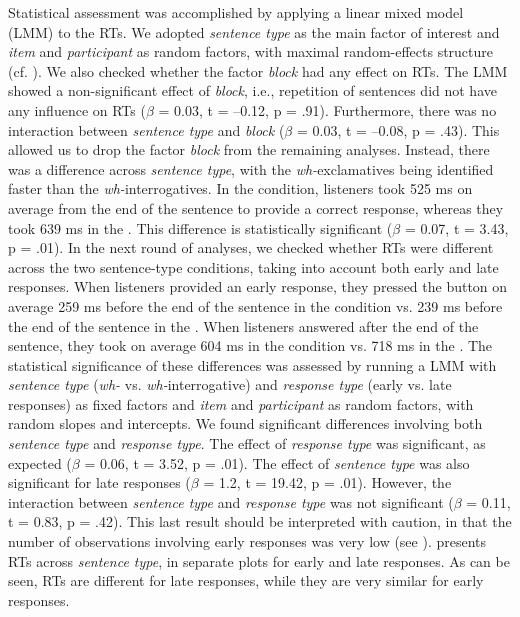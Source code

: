 \documentclass[output=paper]{langsci/langscibook}
\begin{document}
Statistical assessment was accomplished by applying a linear mixed model (LMM) to the RTs. We adopted \textit{sentence type} as the main factor of interest and \textit{item} and \textit{participant} as random factors, with maximal random-effects structure (cf. \citealt{Barr2013}). We also checked whether the factor \textit{block} had any effect on RTs. The LMM showed a non-significant effect of \textit{block}, i.e., repetition of sentences did not have any influence on RTs ($\beta $ = 0.03, t = –0.12, p = .91). Furthermore, there was no interaction between \textit{sentence type} and \textit{block} ($\beta $ = 0.03, t = –0.08, p = .43). This allowed us to drop the factor \textit{block} from the remaining analyses. Instead, there was a difference across \textit{sentence type}, with the \textit{wh-}exclamatives being identified faster than the \textit{wh-}interrogatives. In the  condition, listeners took 525 ms on average from the end of the sentence to provide a correct response, whereas they took 639 ms in the . This difference is statistically significant ($\beta $ = 0.07, t = 3.43, p = .01). In the next round of analyses, we checked whether RTs were different across the two sentence-type conditions, taking into account both early and late responses. When listeners provided an early response, they pressed the button on average 259 ms before the end of the sentence in the  condition vs. 239 ms before the end of the sentence in the . When listeners answered after the end of the sentence, they took on average 604 ms in the  condition vs. 718 ms in the . The statistical significance of these differences was assessed by running a LMM with \textit{sentence type} (\textit{wh-} vs. \textit{wh-}interrogative) and \textit{response type} (early vs. late responses) as fixed factors and \textit{item} and \textit{participant} as random factors, with random slopes and intercepts. We found significant differences involving both \textit{sentence type} and \textit{response type}. The effect of \textit{response type} was significant, as expected ($\beta $ = 0.06, t = 3.52, p = .01). The effect of \textit{sentence type} was also significant for late responses ($\beta $ = 1.2, t = 19.42, p = .01). However, the interaction between \textit{sentence type} and \textit{response type} was not significant ($\beta $ = 0.11, t = 0.83, p = .42). This last result should be interpreted with caution, in that the number of observations involving early responses was very low (see ).  presents RTs across \textit{sentence type}, in separate plots for early and late responses. As can be seen, RTs are different for late responses, while they are very similar for early responses.
\end{document}
